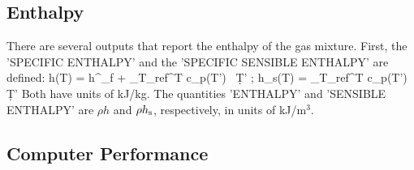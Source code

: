 \documentclass[11pt]{book}
\begin{document}
\subsection{Enthalpy}
\label{info:enthalpy}

There are several outputs that report the enthalpy of the gas mixture. First, the {\ct 'SPECIFIC ENTHALPY'} and the {\ct 'SPECIFIC SENSIBLE ENTHALPY'} are defined:
\be
   h(T) = \Delta h^\circ_{\rm f} + \int_{T_{\rm ref}}^{T} c_p(T') \, \d T'  \quad ; \quad h_{\rm s}(T) = \int_{T_{\rm ref}}^{T} c_p(T') \, \d T'
\ee
Both have units of kJ/kg. The quantities {\ct 'ENTHALPY'} and {\ct 'SENSIBLE ENTHALPY'} are $\rho h$ and $\rho h_{\rm s}$, respectively, in units of kJ/m$^3$.


\subsection{Computer Performance}
\label{info:TIMING}
\end{document}
